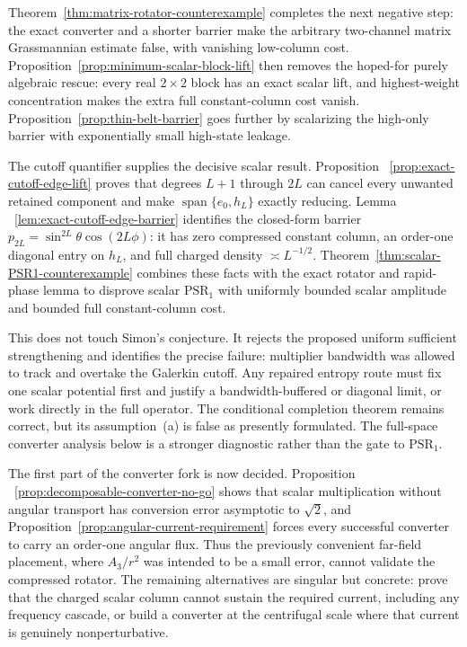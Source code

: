\documentclass[11pt]{article}
\theoremstyle{definition}
\theoremstyle{remark}
\begin{document}
Theorem~\ref{thm:matrix-rotator-counterexample} completes the next negative
step: the exact converter and a shorter barrier make the arbitrary two-channel
matrix Grassmannian estimate false, with vanishing low-column cost.
Proposition~\ref{prop:minimum-scalar-block-lift} then removes the hoped-for
purely algebraic rescue: every real $2\times2$ block has an exact scalar lift,
and highest-weight concentration makes the extra full constant-column cost
vanish.  Proposition~\ref{prop:thin-belt-barrier} goes further by scalarizing
the high-only barrier with exponentially small high-state leakage.

The cutoff quantifier supplies the decisive scalar result.  Proposition
~\ref{prop:exact-cutoff-edge-lift} proves that degrees $L+1$ through $2L$ can
cancel every unwanted retained component and make
$\operatorname{span}\{e_0,h_L\}$ exactly reducing.  Lemma
~\ref{lem:exact-cutoff-edge-barrier} identifies the closed-form barrier
$p_{2L}=\sin^{2L}\theta\cos(2L\phi)$: it has zero compressed constant column,
an order-one diagonal entry on $h_L$, and full charged density
$\asymp L^{-1/2}$.  Theorem~\ref{thm:scalar-PSR1-counterexample} combines these
facts with the exact rotator and rapid-phase lemma to disprove scalar
$\mathrm{PSR}_1$ with uniformly bounded scalar amplitude and bounded full
constant-column cost.

This does not touch Simon's conjecture.  It rejects the proposed uniform
sufficient strengthening and identifies the precise failure: multiplier
bandwidth was allowed to track and overtake the Galerkin cutoff.  Any repaired
entropy route must fix one scalar potential first and justify a
bandwidth-buffered or diagonal limit, or work directly in the full operator.
The conditional completion theorem remains correct, but its assumption~(a) is
false as presently formulated.  The full-space converter analysis below is a
stronger diagnostic rather than the gate to $\mathrm{PSR}_1$.

The first part of the converter fork is now decided.  Proposition
~\ref{prop:decomposable-converter-no-go} shows that scalar multiplication
without angular transport has conversion error asymptotic to $\sqrt2$, and
Proposition~\ref{prop:angular-current-requirement} forces every successful
converter to carry an order-one angular flux.  Thus the previously convenient
far-field placement, where $A_3/r^2$ was intended to be a small error, cannot
validate the compressed rotator.  The remaining alternatives are singular but
concrete: prove that the charged scalar column cannot sustain the required
current, including any frequency cascade, or build a converter at the
centrifugal scale where that current is genuinely nonperturbative.
\end{document}
